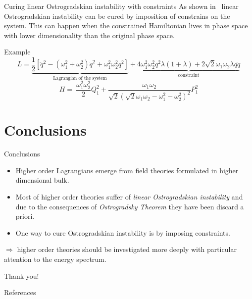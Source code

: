 \documentclass[10pt]{beamer}
\begin{document}
  \begin{frame}{Curing linear Ostrogradskian instability with constraints}
    As shown in~\cite{Chen13} linear Ostrogradskian instability can be cured by
    imposition of constrains on the system. This can happen when the constrained
    Hamiltonian lives in phase space with lower dimensionality than the original
    phase space. \vspace{1.0em}
    \begin{block}{Example}
      \vspace{0.2em}
      \begin{equation*}
        L =
        \underbrace{
          \frac{1}{2} \left[
          \ddot{q}^2 - (\omega_1^2 + \omega_2^2) \dot{q}^2 +
          \omega_1^2 \omega_2^2 q^2 \right]
        }_{\text{Lagrangian of the system}} +
        \underbrace{
          4 \omega_1^2\omega_2^2 q^2 \lambda (1+ \lambda) +
          2 \sqrt{2} \omega_1\omega_2 \lambda q \ddot{q}
        }_{\text{constraint}}
      \end{equation*}
      \vspace{0.2em}
      \begin{equation*}
        H =\ \frac{\omega_1^2\omega_2^2}{2} Q_1^2 +
        \frac{\omega_1\omega_2}{\sqrt{2} {\left(\sqrt{2} \omega_1\omega_2 -
        \omega_1^2 - \omega_2^2 \right)}^2} P_1^2
      \end{equation*}
    \end{block}
  \end{frame}

  \section{Conclusions}

  \begin{frame}{Conclusions}
    \begin{itemize}
      \item Higher order Lagrangians emerge from field theories formulated in
        higher dimensional bulk. \vspace{0.5em}
      \item Most of higher order theories suffer of \emph{linear Ostrogradskian
        instability} and due to the consequences of \emph{Ostrogradsky Theorem}
        they have been discard a priori. \vspace{0.5em}
      \item One way to cure Ostrogradskian instability is by imposing
        constraints.
    \end{itemize} \vspace{1.0em}
    $\Rightarrow$ higher order theories should be investigated more
    deeply with particular attention to the energy spectrum.
  \end{frame}

  \begin{frame}[standout]
    Thank you!
  \end{frame}

  \begin{frame}[allowframebreaks]{References}
    
    
  \end{frame}
\end{document}
